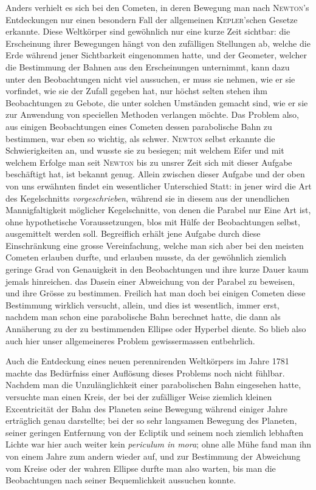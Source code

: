 Anders verhielt es sich bei den Cometen, in deren Bewegung man nach \textsc{Newton}'s Entdeckungen nur einen besondern Fall der allgemeinen \textsc{Kepler}'schen Gesetze erkannte. Diese Weltkörper sind gewöhnlich nur eine kurze Zeit sichtbar: die Erscheinung ihrer Bewegungen hängt von den zufälligen Stellungen ab, welche die Erde während jener Sichtbarkeit eingenommen hatte, und der Geometer, welcher die Bestimmung der Bahnen aus den Erscheinungen unternimmt,
kann dazu unter den Beobachtungen nicht viel aussuchen, er muss sie nehmen, wie er sie vorfindet, wie sie der Zufall gegeben hat, nur höchst selten stehen ihm Beobachtungen zu Gebote, die unter solchen Umständen gemacht sind, wie er sie zur Anwendung von speciellen Methoden verlangen möchte. Das Problem also, aus einigen Beobachtungen eines Cometen dessen parabolische Bahn zu bestimmen, war eben so wichtig, als schwer. \textsc{Newton} selbst erkannte die Schwierigkeiten an, und wusste sie zu besiegen; mit welchem Eifer und mit welchem Erfolge man seit \textsc{Newton} bis zu unsrer Zeit sich mit dieser Aufgabe beschäftigt hat, ist bekannt genug. Allein zwischen dieser Aufgabe und der oben von uns erwähnten findet ein wesentlicher Unterschied Statt: in jener wird die Art des Kegelschnitts \textit{vorgeschrieben}, während sie in diesem aus der unendlichen Mannigfaltigkeit möglicher Kegelschnitte, von denen die Parabel nur Eine Art ist, ohne hypothetische Voraussetzungen, blos mit Hülfe der Beobachtungen selbst, ausgemittelt werden soll. Begreiflich erhält jene Aufgabe durch diese Einschränkung eine grosse Vereinfachung, welche man sich aber bei den meisten Cometen erlauben durfte, und erlauben musste, da der gewöhnlich ziemlich geringe Grad von Genauigkeit in den Beobachtungen und ihre kurze Dauer kaum jemals hinreichen. das Dasein einer Abweichung von der Parabel zu beweisen, und ihre Grösse zu bestimmen. Freilich hat man doch bei einigen Cometen diese Bestimmung wirklich versucht, allein, und dies ist wesentlich, immer erst, nachdem man schon eine parabolische Bahn berechnet hatte, die dann als Annäherung zu der zu bestimmenden Ellipse oder Hyperbel diente. So blieb also auch hier unser allgemeineres Problem gewissermassen entbehrlich.

Auch die Entdeckung eines neuen perennirenden Weltkörpers im Jahre 1781 machte das Bedürfniss einer Auflösung dieses Problems noch nicht fühlbar. Nachdem man die Unzulänglichkeit einer parabolischen Bahn eingesehen hatte, versuchte man einen Kreis, der bei der zufälliger Weise ziemlich kleinen Excentricität der Bahn des Planeten seine Bewegung während einiger Jahre erträglich genau darstellte; bei der so sehr langsamen Bewegung des Planeten, seiner geringen Entfernung von der Ecliptik und seinem noch ziemlich lebhaften Lichte war hier auch weiter kein \textit{periculum in mora}; ohne alle Mühe fand man ihn von einem Jahre zum andern wieder auf, und zur Bestimmung der Abweichung vom Kreise oder der wahren Ellipse durfte man also warten, bis man die Beobachtungen nach seiner Bequemlichkeit aussuchen konnte.

